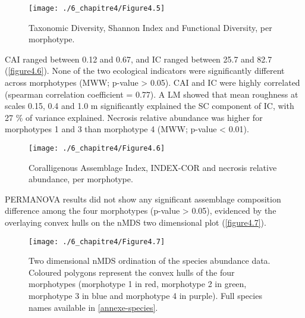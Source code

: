 \begin{figure}[H]
	\begin{center}
	\texttt{[image: ./6\_chapitre4/Figure4.5]}
		\caption[Taxonomic Diversity, Shannon Index and Functional Diversity, per morphotype]{Taxonomic Diversity, Shannon Index and Functional Diversity, per morphotype.}
	\label{figure4.5}
\end{center}
\end{figure}

CAI ranged between 0.12 and 0.67, and IC ranged between 25.7 and 82.7 (\autoref{figure4.6}). None of the two ecological indicators were significantly different across morphotypes (MWW; p-value > 0.05). CAI and IC were highly correlated (spearman correlation coefficient = 0.77). A LM showed that mean roughness at scales 0.15, 0.4 and 1.0 m significantly explained the SC component of IC, with 27 \% of variance explained. Necrosis relative abundance was higher for morphotypes 1 and 3 than morphotype 4 (MWW; p-value < 0.01).

\begin{figure}[H]
	\begin{center}
	\texttt{[image: ./6\_chapitre4/Figure4.6]}
		\caption[Coralligenous Assemblage Index, INDEX-COR and necrosis relative abundance, per morphotype]{Coralligenous Assemblage Index, INDEX-COR and necrosis relative abundance, per morphotype.}
	\label{figure4.6}
\end{center}
\end{figure}

PERMANOVA results did not show any significant assemblage composition difference among the four morphotypes (p-value > 0.05), evidenced by the overlaying convex hulls on the nMDS two dimensional plot (\autoref{figure4.7}).

\begin{figure}[H]
	\begin{center}
	\texttt{[image: ./6\_chapitre4/Figure4.7]}
		\caption[Two dimensional nMDS ordination of the species abundance data]{Two dimensional nMDS ordination of the species abundance data. Coloured polygons represent the convex hulls of the four morphotypes (morphotype 1 in red, morphotype 2 in green, morphotype 3 in blue and morphotype 4 in purple). Full species names available in \autoref{annexe-species}.}
	\label{figure4.7}
\end{center}
\end{figure}

